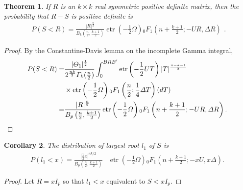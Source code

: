 \documentclass{amsart}
\newtheorem{theorem}{Theorem}[section]
\newtheorem{corollary}[theorem]{Corollary}
\theoremstyle{definition}
\numberwithin{equation}{section}
\begin{document}
        \begin{theorem}
	If $R$ is an $k \times k$ real symmetric positive definite matrix, then the probability that $R - S$ is positive definite is
	\[\begin{aligned}
		P(S < R) = \frac{| R|^\frac{n}{2} }{{B}_{k}\left(\frac{n}{2},\frac{k+1}{2}\right)}
		\operatorname{etr} \left(-\frac{1}{2} \varOmega\right) {}_{0}F_{1} \left(n + \frac{k+1}{2}; -  U  R, \varDelta  R\right)\end{aligned}.\]
\end{theorem}
\begin{proof}
	By the Constantine-Davis lemma on the incomplete Gamma integral, 
	\[\begin{aligned}
		P(S < R) = & 	\frac{| \varTheta_{1}|^{\frac{1}{2}}}{2^{\frac{nk}{2}}\varGamma_{k}(\frac{n}{2})} \int_{0}^{BRB'}  \operatorname{etr} \left(-\frac{1}{2} UT \right) | T|^{\frac{n-k-1}{2}} \\
		& \times \operatorname{etr} \left(-\frac{1}{2} \varOmega\right){}_{0}F_{1}\left(\frac{n}{2};\frac{1}{4} \varDelta T\right) (dT)\\
		= & \frac{| R|^\frac{n}{2} }{{B}_{p}\left(\frac{n}{2},\frac{k+1}{2}\right)}
		\operatorname{etr} \left(-\frac{1}{2} \varOmega\right) {}_{0}F_{1} \left(n + \frac{k+1}{2}; -  U  R, \varDelta  R\right).\qedhere
	\end{aligned}
	\]
\end{proof}
\begin{corollary} The distribution of largest root $l_{1}$ of $S$ is 
	\[\begin{aligned} 
		P(l_{1} < x) =  \frac{|\frac{1}{2}x|^{nk/2}}{B_p\left(\frac{n}{2},\frac{k+1}{2}\right)}&\operatorname{etr} \left(-\frac{1}{2}\varOmega\right){}_{0}F_{1} \left(n + \frac{k+1}{2}; -  xU, x\varDelta\right).\end{aligned}\]
\end{corollary}
\begin{proof}
	Let $R = xI_{p}$ so that $l_{1} < x$ equivalent to $S < xI_{p}$.
\end{proof}
\end{document}
